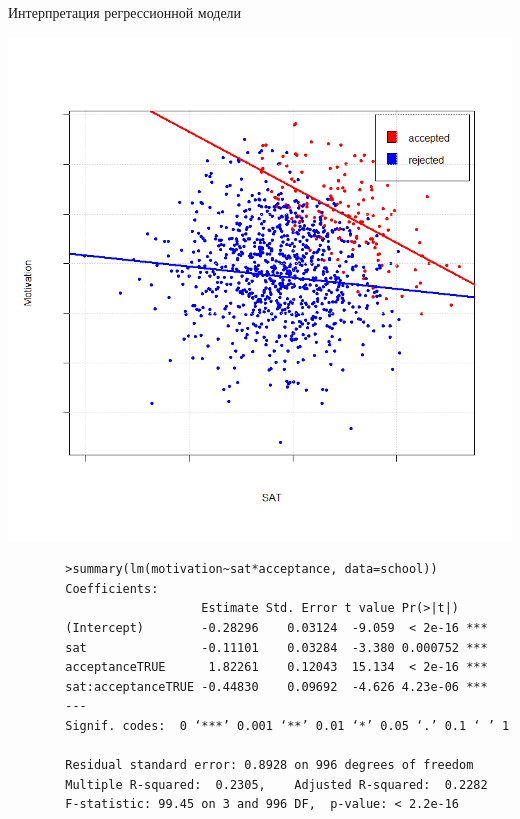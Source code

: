 \documentclass[9pt,pdf,utf8,hyperref={unicode},aspectratio=169]{beamer}
\begin{document}
\begin{frame}[fragile]{Интерпретация регрессионной модели}	
	\begin{center}
		\includegraphics[height=0.5\textheight]{causality3.png}
	\end{center}
		
	\vspace{-5pt}
	
	{\footnotesize
		\begin{verbatim}
		>summary(lm(motivation~sat*acceptance, data=school))
		Coefficients:
		                   Estimate Std. Error t value Pr(>|t|)    
		(Intercept)        -0.28296    0.03124  -9.059  < 2e-16 ***
		sat                -0.11101    0.03284  -3.380 0.000752 ***
		acceptanceTRUE      1.82261    0.12043  15.134  < 2e-16 ***
		sat:acceptanceTRUE -0.44830    0.09692  -4.626 4.23e-06 ***
		---
		Signif. codes:  0 ‘***’ 0.001 ‘**’ 0.01 ‘*’ 0.05 ‘.’ 0.1 ‘ ’ 1
		
		Residual standard error: 0.8928 on 996 degrees of freedom
		Multiple R-squared:  0.2305,	Adjusted R-squared:  0.2282 
		F-statistic: 99.45 on 3 and 996 DF,  p-value: < 2.2e-16
		\end{verbatim}		
	}		
\end{frame}
\end{document}
